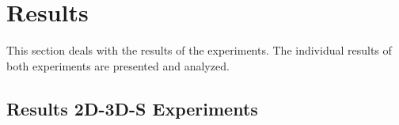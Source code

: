 \documentclass[main.tex]{subfiles}
\begin{document}
\section{Results}
This section deals with the results of the experiments. The individual results of both experiments are presented and analyzed.
\subsection{Results 2D-3D-S Experiments}
\end{document}
